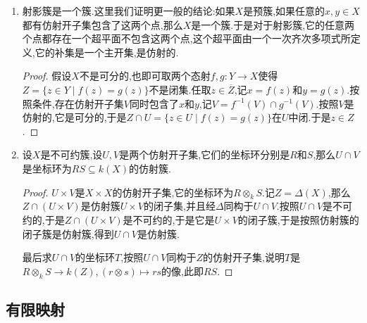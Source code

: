 \begin{enumerate}
\begin{proof}
		记$X,Y$的积对象是$(X\times Y,p_X,p_Y)$,考虑两个态射$g=p_Y,h=f\circ p_X:X\times Y\to Y$,那么有$\{(x,y)\in X\times Y\mid g(x,y)=h(x,y)\}=\{(x,y)\in X\times Y\mid y=f(x)\}=\Gamma_f$,按照可分公理得到这是$X\times Y$的闭子集.
	\end{proof}
	\item 射影簇是一个簇.这里我们证明更一般的结论:如果$X$是预簇,如果任意的$x,y\in X$都有仿射开子集包含了这两个点,那么$X$是一个簇.于是对于射影簇,它的任意两个点都存在一个超平面不包含这两个点,这个超平面由一个一次齐次多项式所定义,它的补集是一个主开集,是仿射的.
	\begin{proof}
		
		假设$X$不是可分的,也即可取两个态射$f,g:Y\to X$使得$Z=\{z\in Y\mid f(z)=g(z)\}$不是闭集.任取$z\in\overline{Z}$,记$x=f(z)$和$y=g(z)$.按照条件,存在仿射开子集$V$同时包含了$x$和$y$,记$V=f^{-1}(V)\cap g^{-1}(V)$.按照$V$是仿射的,它是可分的,于是$Z\cap U=\{z\in U\mid f(z)=g(z)\}$在$U$中闭.于是$z\in Z$.
	\end{proof}
    \item 设$X$是不可约簇,设$U,V$是两个仿射开子集,它们的坐标环分别是$R$和$S$,那么$U\cap V$是坐标环为$RS\subseteq k(X)$的仿射簇.
    \begin{proof}
    	
    	$U\times V$是$X\times X$的仿射开子集,它的坐标环为$R\otimes_kS$.记$Z=\Delta(X)$,那么$Z\cap(U\times V)$是仿射簇$U\times V$的闭子集,并且经$\Delta$同构于$U\cap V$.按照$U\cap V$是不可约的,于是$Z\cap(U\times V)$是不可约的,于是它是$U\times V$的闭子簇,于是按照仿射簇的闭子簇是仿射簇,得到$U\cap V$是仿射簇.
    	
    	最后求$U\cap V$的坐标环$T$,按照$U\cap V$同构于$Z$的仿射开子集,说明$T$是$R\otimes_kS\to k(Z),(r\otimes s)\mapsto rs$的像,此即$RS$.
    \end{proof}
\end{enumerate}
\subsection{有限映射}

